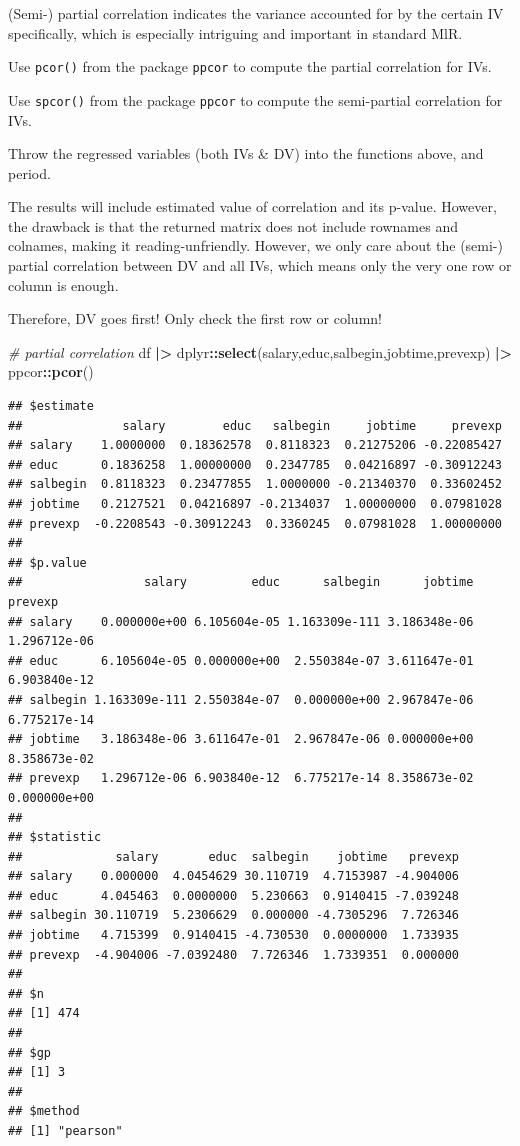 \documentclass[
]{ctexart}
\newenvironment{Shaded}{\begin{snugshade}}{\end{snugshade}}
\newcommand{\CommentTok}[1]{\textcolor[rgb]{0.56,0.35,0.01}{\textit{#1}}}
\newcommand{\FunctionTok}[1]{\textcolor[rgb]{0.13,0.29,0.53}{\textbf{#1}}}
\newcommand{\NormalTok}[1]{#1}
\newcommand{\SpecialCharTok}[1]{\textcolor[rgb]{0.81,0.36,0.00}{\textbf{#1}}}
\begin{document}
(Semi-) partial correlation indicates the variance accounted for by the
certain IV specifically, which is especially intriguing and important in
standard MlR.

Use \texttt{pcor()} from the package \texttt{ppcor} to compute the
partial correlation for IVs.

Use \texttt{spcor()} from the package \texttt{ppcor} to compute the
semi-partial correlation for IVs.

Throw the regressed variables (both IVs \& DV) into the functions above,
and period.

The results will include estimated value of correlation and its p-value.
However, the drawback is that the returned matrix does not include
rownames and colnames, making it reading-unfriendly. However, we only
care about the (semi-) partial correlation between DV and all IVs, which
means only the very one row or column is enough.

Therefore, DV goes first! Only check the first row or column!

\begin{Shaded}
\begin{Highlighting}[]
\CommentTok{\# partial correlation}
\NormalTok{df }\SpecialCharTok{|\textgreater{}}\NormalTok{ dplyr}\SpecialCharTok{::}\FunctionTok{select}\NormalTok{(salary,educ,salbegin,jobtime,prevexp) }\SpecialCharTok{|\textgreater{}} 
\NormalTok{  ppcor}\SpecialCharTok{::}\FunctionTok{pcor}\NormalTok{()}
\end{Highlighting}
\end{Shaded}

\begin{verbatim}
## $estimate
##              salary        educ   salbegin     jobtime     prevexp
## salary    1.0000000  0.18362578  0.8118323  0.21275206 -0.22085427
## educ      0.1836258  1.00000000  0.2347785  0.04216897 -0.30912243
## salbegin  0.8118323  0.23477855  1.0000000 -0.21340370  0.33602452
## jobtime   0.2127521  0.04216897 -0.2134037  1.00000000  0.07981028
## prevexp  -0.2208543 -0.30912243  0.3360245  0.07981028  1.00000000
## 
## $p.value
##                 salary         educ      salbegin      jobtime      prevexp
## salary    0.000000e+00 6.105604e-05 1.163309e-111 3.186348e-06 1.296712e-06
## educ      6.105604e-05 0.000000e+00  2.550384e-07 3.611647e-01 6.903840e-12
## salbegin 1.163309e-111 2.550384e-07  0.000000e+00 2.967847e-06 6.775217e-14
## jobtime   3.186348e-06 3.611647e-01  2.967847e-06 0.000000e+00 8.358673e-02
## prevexp   1.296712e-06 6.903840e-12  6.775217e-14 8.358673e-02 0.000000e+00
## 
## $statistic
##             salary       educ  salbegin    jobtime   prevexp
## salary    0.000000  4.0454629 30.110719  4.7153987 -4.904006
## educ      4.045463  0.0000000  5.230663  0.9140415 -7.039248
## salbegin 30.110719  5.2306629  0.000000 -4.7305296  7.726346
## jobtime   4.715399  0.9140415 -4.730530  0.0000000  1.733935
## prevexp  -4.904006 -7.0392480  7.726346  1.7339351  0.000000
## 
## $n
## [1] 474
## 
## $gp
## [1] 3
## 
## $method
## [1] "pearson"
\end{verbatim}
\end{document}

